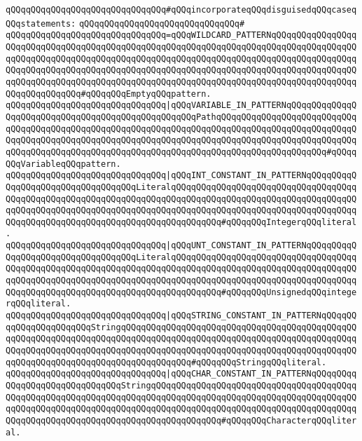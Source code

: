 \verb|qQQqqQQqqQQqqQQqqQQqqQQqqQQqqQQq#qQQqincorporateqQQqdisguisedqQQqcaseqQQqstatements:|\newline
\verb|qQQqqQQqqQQqqQQqqQQqqQQqqQQqqQQq#|\newline
\verb|qQQqqQQqqQQqqQQqqQQqqQQqqQQqqQQq=qQQqWILDCARD_PATTERNqQQqqQQqqQQqqQQqqQQqqQQqqQQqqQQqqQQqqQQqqQQqqQQqqQQqqQQqqQQqqQQqqQQqqQQqqQQqqQQqqQQqqQQqqQQqqQQqqQQqqQQqqQQqqQQqqQQqqQQqqQQqqQQqqQQqqQQqqQQqqQQqqQQqqQQqqQQqqQQqqQQqqQQqqQQqqQQqqQQqqQQqqQQqqQQqqQQqqQQqqQQqqQQqqQQqqQQqqQQqqQQqqQQqqQQqqQQqqQQqqQQqqQQqqQQqqQQqqQQqqQQqqQQqqQQqqQQqqQQqqQQqqQQqqQQqqQQqqQQqqQQqqQQqqQQq#qQQqqQQqEmptyqQQqpattern.|\newline
\verb|qQQqqQQqqQQqqQQqqQQqqQQqqQQqqQQq|\verb#|qQQqVARIABLE_IN_PATTERNqQQqqQQqqQQqqQQqqQQqqQQqqQQqqQQqqQQqqQQqqQQqqQQqqQQqPathqQQqqQQqqQQqqQQqqQQqqQQqqQQqqQQqqQQqqQQqqQQqqQQqqQQqqQQqqQQqqQQqqQQqqQQqqQQqqQQqqQQqqQQqqQQqqQQqqQQqqQQqqQQqqQQqqQQqqQQqqQQqqQQqqQQqqQQqqQQqqQQqqQQqqQQqqQQqqQQqqQQqqQQqqQQqqQQqqQQqqQQqqQQqqQQqqQQqqQQqqQQqqQQqqQQqqQQqqQQqqQQqqQQqqQQq#\verb|#qQQqqQQqVariableqQQqpattern.|\newline
\verb|qQQqqQQqqQQqqQQqqQQqqQQqqQQqqQQq|\verb#|qQQqINT_CONSTANT_IN_PATTERNqQQqqQQqqQQqqQQqqQQqqQQqqQQqqQQqqQQqLiteralqQQqqQQqqQQqqQQqqQQqqQQqqQQqqQQqqQQqqQQqqQQqqQQqqQQqqQQqqQQqqQQqqQQqqQQqqQQqqQQqqQQqqQQqqQQqqQQqqQQqqQQqqQQqqQQqqQQqqQQqqQQqqQQqqQQqqQQqqQQqqQQqqQQqqQQqqQQqqQQqqQQqqQQqqQQqqQQqqQQqqQQqqQQqqQQqqQQqqQQqqQQqqQQqqQQqqQQqqQQq#\verb|#qQQqqQQqIntegerqQQqliteral.|\newline
\verb|qQQqqQQqqQQqqQQqqQQqqQQqqQQqqQQq|\verb#|qQQqUNT_CONSTANT_IN_PATTERNqQQqqQQqqQQqqQQqqQQqqQQqqQQqqQQqqQQqLiteralqQQqqQQqqQQqqQQqqQQqqQQqqQQqqQQqqQQqqQQqqQQqqQQqqQQqqQQqqQQqqQQqqQQqqQQqqQQqqQQqqQQqqQQqqQQqqQQqqQQqqQQqqQQqqQQqqQQqqQQqqQQqqQQqqQQqqQQqqQQqqQQqqQQqqQQqqQQqqQQqqQQqqQQqqQQqqQQqqQQqqQQqqQQqqQQqqQQqqQQqqQQqqQQqqQQqqQQqqQQq#\verb|#qQQqqQQqUnsignedqQQqintegerqQQqliteral.|\newline
\verb|qQQqqQQqqQQqqQQqqQQqqQQqqQQqqQQq|\verb#|qQQqSTRING_CONSTANT_IN_PATTERNqQQqqQQqqQQqqQQqqQQqqQQqStringqQQqqQQqqQQqqQQqqQQqqQQqqQQqqQQqqQQqqQQqqQQqqQQqqQQqqQQqqQQqqQQqqQQqqQQqqQQqqQQqqQQqqQQqqQQqqQQqqQQqqQQqqQQqqQQqqQQqqQQqqQQqqQQqqQQqqQQqqQQqqQQqqQQqqQQqqQQqqQQqqQQqqQQqqQQqqQQqqQQqqQQqqQQqqQQqqQQqqQQqqQQqqQQqqQQqqQQqqQQqqQQq#\verb|#qQQqqQQqStringqQQqliteral.|\newline
\verb|qQQqqQQqqQQqqQQqqQQqqQQqqQQqqQQq|\verb#|qQQqCHAR_CONSTANT_IN_PATTERNqQQqqQQqqQQqqQQqqQQqqQQqqQQqqQQqStringqQQqqQQqqQQqqQQqqQQqqQQqqQQqqQQqqQQqqQQqqQQqqQQqqQQqqQQqqQQqqQQqqQQqqQQqqQQqqQQqqQQqqQQqqQQqqQQqqQQqqQQqqQQqqQQqqQQqqQQqqQQqqQQqqQQqqQQqqQQqqQQqqQQqqQQqqQQqqQQqqQQqqQQqqQQqqQQqqQQqqQQqqQQqqQQqqQQqqQQqqQQqqQQqqQQqqQQqqQQqqQQq#\verb|#qQQqqQQqCharacterqQQqliteral.|\newline
